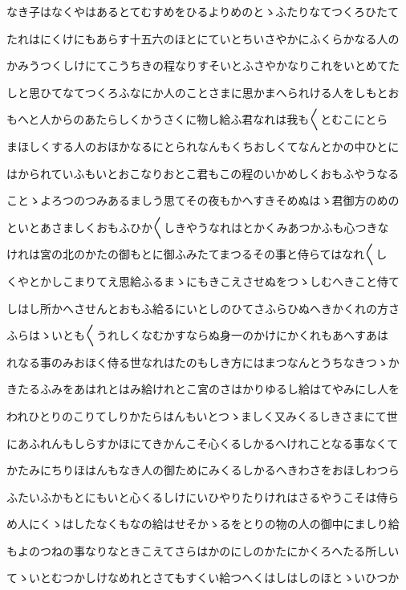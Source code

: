 \documentclass[a4paper,11pt,landscape]{ltjtarticle}
\begin{document}
なき子はなくやはあるとてむすめをひるよりめのとゝふたりなてつくろひたて
\par\medskip
たれはにくけにもあらす十五六のほとにていとちいさやかにふくらかなる人の
\par\medskip
かみうつくしけにてこうちきの程なりすそいとふさやかなりこれをいとめてた
\par\medskip
しと思ひてなてつくろふなにか人のことさまに思かまへられける人をしもとお
\par\medskip
もへと人からのあたらしくかうさくに物し給ふ君なれは我も〱とむこにとら
\par\medskip
まほしくする人のおほかなるにとられなんもくちおしくてなんとかの中ひとに
\par\medskip
はかられていふもいとおこなりおとこ君もこの程のいかめしくおもふやうなる
\par\medskip
ことゝよろつのつみあるましう思てその夜もかへすきそめぬはゝ君御方のめの
\par\medskip
といとあさましくおもふひか〱しきやうなれはとかくみあつかふも心つきな
\par\medskip
けれは宮の北のかたの御もとに御ふみたてまつるその事と侍らてはなれ〱し
\par\medskip
くやとかしこまりてえ思給ふるまゝにもきこえさせぬをつゝしむへきこと侍て
\par\medskip
しはし所かへさせんとおもふ給るにいとしのひてさふらひぬへきかくれの方さ
\par\medskip
ふらはゝいとも〱うれしくなむかすならぬ身一のかけにかくれもあへすあは
\par\medskip
れなる事のみおほく侍る世なれはたのもしき方にはまつなんとうちなきつゝか
\par\medskip
きたるふみをあはれとはみ給けれとこ宮のさはかりゆるし給はてやみにし人を
\par\medskip
われひとりのこりてしりかたらはんもいとつゝましく又みくるしきさまにて世
\par\medskip
にあふれんもしらすかほにてきかんこそ心くるしかるへけれことなる事なくて
\par\medskip
かたみにちりほはんもなき人の御ためにみくるしかるへきわさをおほしわつら
\par\medskip
ふたいふかもとにもいと心くるしけにいひやりたりけれはさるやうこそは侍ら
\par\medskip
め人にくゝはしたなくもなの給はせそかゝるをとりの物の人の御中にましり給
\par\medskip
もよのつねの事なりなときこえてさらはかのにしのかたにかくろへたる所しい
\par\medskip
てゝいとむつかしけなめれとさてもすくい給つへくはしはしのほとゝいひつか
\end{document}
